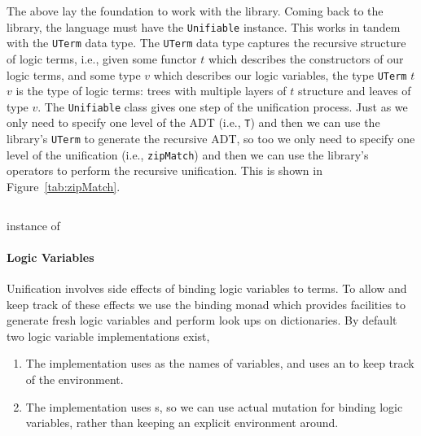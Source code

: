 \documentclass[thesis-solanki.tex]{subfiles}
\begin{document}
The above lay the foundation to work with the library.
Coming back to the library, the language must have the \Verb!Unifiable! instance.
This works in tandem with the \Verb!UTerm! data type.
The \Verb!UTerm! data type captures the recursive structure of logic terms, i.e., given
some functor \(t\) which describes the 
constructors of our logic terms, and some type \(v\) which describes our logic variables, the type
\Verb!UTerm! \(t\) \(v\) is the
type of logic terms: trees with multiple layers of \(t\) structure and leaves of type \(v\).
The \Verb!Unifiable! class gives one step of the unification process.
Just as we only need to specify one level of the ADT (i.e., \Verb!T!) and then we can use the library's \Verb!UTerm! to generate
the recursive ADT, so too we only need to specify one level of the unification (i.e., \Verb!zipMatch!) and then we can use
the library's operators to perform the recursive unification.
This is shown in Figure~\ref{tab:zipMatch}.
\begin{code-list}
  \begin{singlespace}
    \inputminted[linenos]{haskell}{haskell-proto1-zip-flat.hs}
  \end{singlespace}
  \vspace*{-0.5\baselineskip}
  \caption{\protect{} instance of \protect{}}
  \label{tab:zipMatch}
\end{code-list}

\paragraph{Logic Variables}
Unification involves side effects of binding logic variables to terms. To allow and keep track of these effects we use the binding monad
which provides facilities to generate fresh logic variables and perform look ups on dictionaries. By default two logic variable
implementations exist,

\begin{enumerate}
\item The  implementation uses  as the names of variables, and uses an
   to keep track of the environment. 

\item The  implementation uses s, so we can use actual mutation for binding logic
  variables, rather than keeping an explicit environment around.

\end{enumerate}
\end{document}
